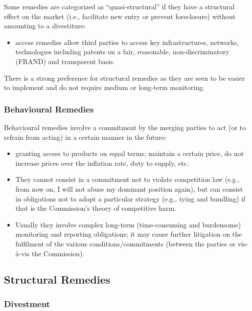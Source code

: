     Some remedies are categorized as \textquotedblleft quasi-structural\textquotedblright{} if they have a structural effect on the market (i.e., facilitate new entry or prevent foreclosure) without amounting to a divestiture:
    \begin{itemize}
        \item access remedies allow third parties to access key infrastructures, networks, technologies including patents on a fair, reasonable, non-discriminatory (FRAND) and transparent basis.
    \end{itemize}
    
    There is a strong preference for structural remedies as they are seen to be easier to implement and do not require medium or long-term monitoring.

    \subsubsection{Behavioural Remedies}
    
    Behavioural remedies involve a commitment by the merging parties to act (or to refrain from acting) in a certain manner in the future:
    \begin{itemize}
        \item granting access to products on equal terms; maintain a certain price, do not increase prices over the inflation rate, duty to supply, etc.
        \item They cannot consist in a commitment not to violate competition law (e.g., from now on, I will not abuse my dominant position again), but can consist in obligations not to adopt a particular strategy (e.g., tying and bundling) if that is the Commission’s theory of competitive harm.
        \item Usually they involve complex long-term (time-consuming and burdensome) monitoring and reporting obligations; it may cause further litigation on the fulfilment of the various conditions/commitments (between the parties or vis-à-vis the Commission).
    \end{itemize}
    

    \subsection{Structural Remedies}

        \subsubsection{Divestment}

